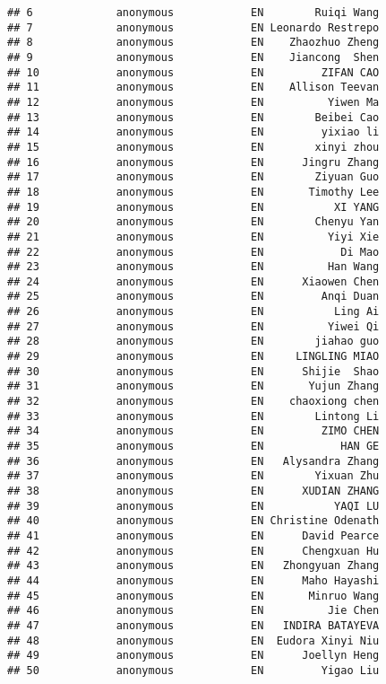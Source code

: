 \documentclass[]{article}
\begin{document}
\begin{verbatim}
## 6             anonymous            EN        Ruiqi Wang
## 7             anonymous            EN Leonardo Restrepo
## 8             anonymous            EN    Zhaozhuo Zheng
## 9             anonymous            EN    Jiancong  Shen
## 10            anonymous            EN         ZIFAN CAO
## 11            anonymous            EN    Allison Teevan
## 12            anonymous            EN          Yiwen Ma
## 13            anonymous            EN        Beibei Cao
## 14            anonymous            EN         yixiao li
## 15            anonymous            EN        xinyi zhou
## 16            anonymous            EN      Jingru Zhang
## 17            anonymous            EN        Ziyuan Guo
## 18            anonymous            EN       Timothy Lee
## 19            anonymous            EN           XI YANG
## 20            anonymous            EN        Chenyu Yan
## 21            anonymous            EN          Yiyi Xie
## 22            anonymous            EN            Di Mao
## 23            anonymous            EN          Han Wang
## 24            anonymous            EN      Xiaowen Chen
## 25            anonymous            EN         Anqi Duan
## 26            anonymous            EN           Ling Ai
## 27            anonymous            EN          Yiwei Qi
## 28            anonymous            EN        jiahao guo
## 29            anonymous            EN     LINGLING MIAO
## 30            anonymous            EN      Shijie  Shao
## 31            anonymous            EN       Yujun Zhang
## 32            anonymous            EN    chaoxiong chen
## 33            anonymous            EN        Lintong Li
## 34            anonymous            EN         ZIMO CHEN
## 35            anonymous            EN            HAN GE
## 36            anonymous            EN   Alysandra Zhang
## 37            anonymous            EN        Yixuan Zhu
## 38            anonymous            EN      XUDIAN ZHANG
## 39            anonymous            EN           YAQI LU
## 40            anonymous            EN Christine Odenath
## 41            anonymous            EN      David Pearce
## 42            anonymous            EN      Chengxuan Hu
## 43            anonymous            EN   Zhongyuan Zhang
## 44            anonymous            EN      Maho Hayashi
## 45            anonymous            EN       Minruo Wang
## 46            anonymous            EN          Jie Chen
## 47            anonymous            EN   INDIRA BATAYEVA
## 48            anonymous            EN  Eudora Xinyi Niu
## 49            anonymous            EN      Joellyn Heng
## 50            anonymous            EN         Yigao Liu

\end{verbatim}
\end{document}
